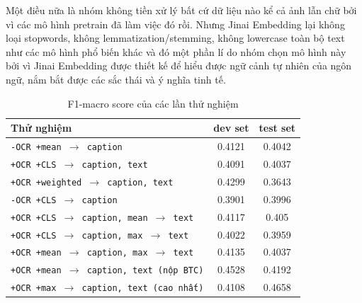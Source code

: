 \documentclass[11pt]{article}
\begin{document}
Một điều nữa là nhóm không tiền xử lý bất cứ dữ liệu nào kể cả ảnh lẫn chữ bởi vì các mô hình pretrain đã làm việc đó rồi. Nhưng Jinai Embedding lại không loại stopwords, không lemmatization/stemming, không lowercase toàn bộ text như các mô hình phổ biến khác và đó một phần lí do nhóm chọn mô hình này bởi vì Jinai Embedding được thiết kế để hiểu được ngữ cảnh tự nhiên của ngôn ngữ, nắm bắt được các sắc thái và ý nghĩa tinh tế.

\begin{table}[h!]
\centering
\small\setlength\tabcolsep{4pt} %
\begin{tabular}{|>{\arraybackslash}m{5cm}|c|c|}
\hline
\textbf{Thử nghiệm} & \textbf{dev set} & \textbf{test set} \\ \hline
\texttt{-OCR +mean $\rightarrow$ caption} & 0.4121 & 0.4042 \\ 
\texttt{+OCR +CLS $\rightarrow$ caption, text} & 0.4091 & 0.4037 \\ 
\texttt{+OCR +weighted $\rightarrow$ caption, text} & 0.4299 & 0.3643 \\ 
\texttt{-OCR +CLS $\rightarrow$ caption} & 0.3901 & 0.3996 \\ 
\texttt{+OCR +CLS $\rightarrow$ caption, mean $\rightarrow$ text} & 0.4117 & 0.405 \\ 
\texttt{+OCR +CLS $\rightarrow$ caption, max $\rightarrow$ text} & 0.4022 & 0.3959 \\ 
\texttt{+OCR +mean $\rightarrow$ caption, max $\rightarrow$ text} & 	0.4135 & 0.4037 \\ 
\texttt{+OCR +mean $\rightarrow$ caption, text (nộp BTC)} & 0.4528 & 0.4192 \\ 
\texttt{+OCR +max $\rightarrow$ caption, text (cao nhất)} & 0.4108 & 0.4658 \\
\hline
\end{tabular}
\caption{F1-macro score của các lần thử nghiệm\footnotemark} %
\label{table:res-info}
\end{table}
\end{document}
